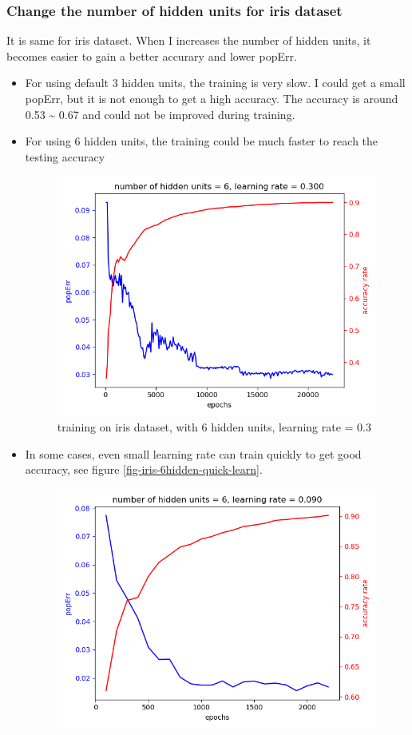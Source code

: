 \documentclass[11pt]{article}
\begin{document}
\subsubsection{Change the number of hidden units for iris dataset}
\label{sec-3-2-2}
It is same for iris dataset. When I increases the number of hidden units, it becomes easier to gain a better accurary and lower popErr.
\begin{itemize}
\item For using default 3 hidden units, the training is very slow. I could get a small popErr, but it is not enough to get a high accuracy. The accuracy is around 0.53 \textasciitilde{} 0.67 and could not be improved during training.
\item For using 6 hidden units, the training could be much faster to reach the testing accuracy
\begin{figure}[htb]
\centering
\includegraphics[width=.9\linewidth]{./popErr_vs_accuracy_on_iris_6hidden_0.3r.png}
\caption{training on iris dataset, with 6 hidden units, learning rate = 0.3 \label{fig-iris-6hidden-larger-learning-rate}}
\end{figure}
\item In some cases, even small learning rate can train quickly to get good accuracy, see figure \ref{fig-iris-6hidden-quick-learn}.
\begin{figure}[htb]
\centering
\includegraphics[width=.9\linewidth]{./popErr_vs_accuracy_on_iris_very_quickly.png}

\end{figure}
\end{itemize}
\end{document}
